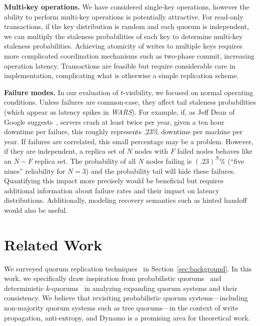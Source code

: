\documentclass{vldb}
\newcommand{\sectionskip}{-0em}
\begin{document}
\textbf{Multi-key operations.} We have considered single-key
operations, however the ability to perform multi-key operations is
potentially attractive.  For read-only transactions, if the key
distribution is random and each quorum is independent, we can multiply
the staleness probabilities of each key to determine multi-key
staleness probabilities. Achieving atomicity of writes to multiple
keys requires more complicated coordination mechanisms such as
two-phase commit, increasing operation latency.  Transactions are
feasible but require considerable care in implementation, complicating
what is otherwise a simple replication scheme.

\textbf{Failure modes.} In our evaluation of $t$-visibility, we
focused on normal operating conditions. Unless failures are
common-case, they affect tail staleness probabilities (which appear as
latency spikes in \textit{WARS}).  For example, if, as Jeff Dean of
Google suggests~\cite{dean-keynote}, servers crash at least twice per
year, given a ten hour downtime per failure, this roughly represents
.23\% downtime per machine per year.  If failures are correlated, this
small percentage may be a problem. However, if they are independent, a
replica set of $N$ nodes with $F$ failed nodes behaves like an $N-F$
replica set.  The probability of all $N$ nodes failing is $(.23)^N$\%
(``five nines'' reliability for $N$$=$$3$) and the probability tail
will hide these failures.  Quantifying this impact more precisely
would be beneficial but requires additional information about failure
rates and their impact on latency distributions. Additionally,
modeling recovery semantics such as hinted handoff~\cite[Section
  4.6]{dynamo} would also be useful.

\vspace{\sectionskip}\section{Related Work}
\label{sec:relatedwork}

We surveyed quorum replication techniques~\cite{prob-quorum-dynamic,
  92-quorums, treequorum, non-strict, multi-k-quorum, quorums-start,
  quorum-placement, partitionedquorum, quorums-alternative,
  prob-quorum, quorum-overview, quorumsystems} in
Section~\ref{sec:background}.  In this work, we specifically draw
inspiration from probabilistic quorums~\cite{prob-quorum} and
deterministic $k$-quorums~\cite{ non-strict, multi-k-quorum} in
analyzing expanding quorum systems and their consistency.  We believe
that revisiting probabilistic quorum systems---including non-majority
quorum systems such as tree quorums---in the context of write
propagation, anti-entropy, and Dynamo is a promising area for
theoretical work.
\end{document}
